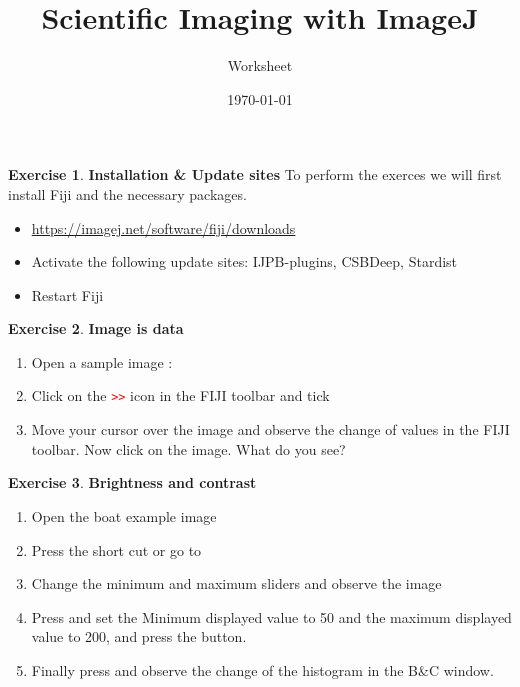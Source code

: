 \documentclass[xcolor=table,DIV=19,twocolumn,10pt]{scrartcl}
\title{Scientific Imaging with ImageJ}
\subtitle{Worksheet}
\date{\today}
\theoremstyle{definition}
\newtheorem{exercice}{Exercise}
\begin{document}
\maketitle

\begin{exercice} \textbf{Installation \& Update sites}
  To perform the exerces we will first install Fiji and the necessary packages.
  \begin{itemize}
  \item \url{https://imagej.net/software/fiji/downloads}
  \item Activate the following update sites: IJPB-plugins, CSBDeep, Stardist
  \item Restart Fiji 
  \end{itemize}

\end{exercice}

\begin{exercice} \textbf{Image is data}
  \begin{enumerate}
  \item Open a sample image : 
  \item Click on the \textcolor{red}{\texttt{>>}} icon in the FIJI toolbar and tick
  \item Move your cursor over the image and observe the change of values in the FIJI toolbar. Now click on the image. What do you see?
  \end{enumerate}
\end{exercice}

\begin{exercice} \textbf{Brightness and contrast}
  \begin{enumerate}
  \item Open the boat example image 
  \item Press the short cut  or go to 
  \item Change the minimum and maximum sliders and observe the image
  \item Press  and set the Minimum displayed value to 50
    and the maximum displayed value to 200, and press the  button.
  \item Finally press  and observe the change of the
    histogram in the B\&C window.
  \end{enumerate}
\end{exercice}
\end{document}
